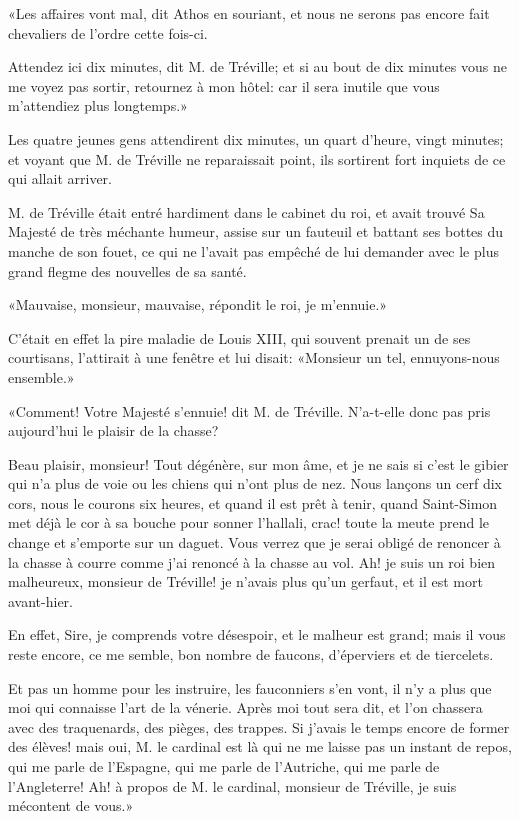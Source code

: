 «Les affaires vont mal, dit Athos en souriant, et nous ne serons pas encore fait chevaliers de l'ordre cette fois-ci. 

\speak  Attendez ici dix minutes, dit M. de Tréville; et si au bout de dix minutes vous ne me voyez pas sortir, retournez à mon hôtel: car il sera inutile que vous m'attendiez plus longtemps.» 

Les quatre jeunes gens attendirent dix minutes, un quart d'heure, vingt minutes; et voyant que M. de Tréville ne reparaissait point, ils sortirent fort inquiets de ce qui allait arriver. 

M. de Tréville était entré hardiment dans le cabinet du roi, et avait trouvé Sa Majesté de très méchante humeur, assise sur un fauteuil et battant ses bottes du manche de son fouet, ce qui ne l'avait pas empêché de lui demander avec le plus grand flegme des nouvelles de sa santé. 

«Mauvaise, monsieur, mauvaise, répondit le roi, je m'ennuie.» 

C'était en effet la pire maladie de Louis XIII, qui souvent prenait un de ses courtisans, l'attirait à une fenêtre et lui disait: «Monsieur un tel, ennuyons-nous ensemble.» 

«Comment! Votre Majesté s'ennuie! dit M. de Tréville. N'a-t-elle donc pas pris aujourd'hui le plaisir de la chasse? 

\speak  Beau plaisir, monsieur! Tout dégénère, sur mon âme, et je ne sais si c'est le gibier qui n'a plus de voie ou les chiens qui n'ont plus de nez. Nous lançons un cerf dix cors, nous le courons six heures, et quand il est prêt à tenir, quand Saint-Simon met déjà le cor à sa bouche pour sonner l'hallali, crac! toute la meute prend le change et s'emporte sur un daguet. Vous verrez que je serai obligé de renoncer à la chasse à courre comme j'ai renoncé à la chasse au vol. Ah! je suis un roi bien malheureux, monsieur de Tréville! je n'avais plus qu'un gerfaut, et il est mort avant-hier. 

\speak  En effet, Sire, je comprends votre désespoir, et le malheur est grand; mais il vous reste encore, ce me semble, bon nombre de faucons, d'éperviers et de tiercelets. 

\speak  Et pas un homme pour les instruire, les fauconniers s'en vont, il n'y a plus que moi qui connaisse l'art de la vénerie. Après moi tout sera dit, et l'on chassera avec des traquenards, des pièges, des trappes. Si j'avais le temps encore de former des élèves! mais oui, M. le cardinal est là qui ne me laisse pas un instant de repos, qui me parle de l'Espagne, qui me parle de l'Autriche, qui me parle de l'Angleterre! Ah! à propos de M. le cardinal, monsieur de Tréville, je suis mécontent de vous.» 

